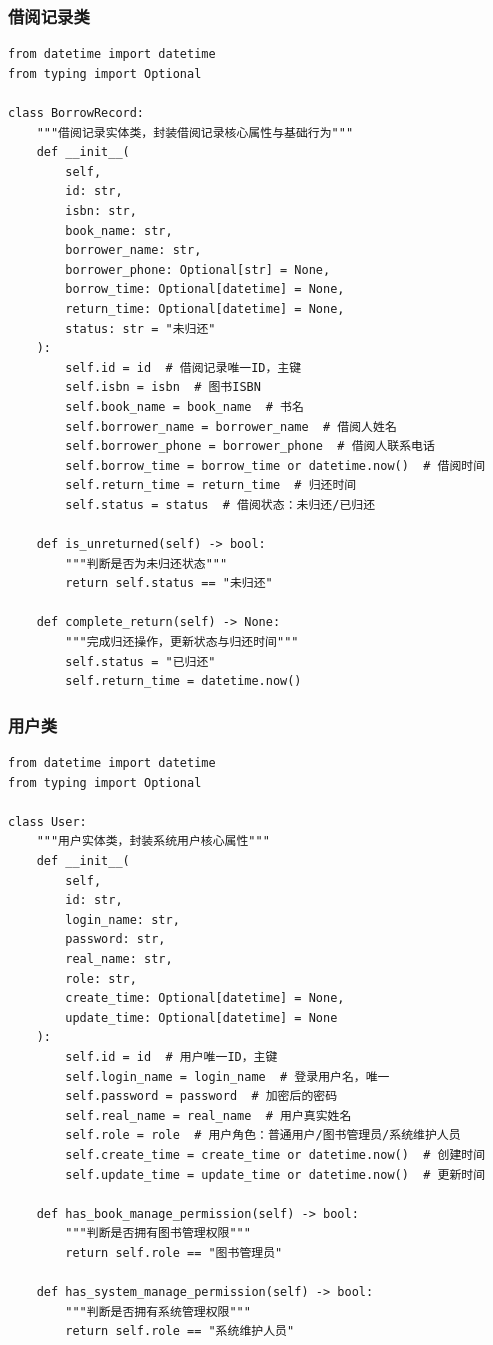 \documentclass[12pt, a4paper]{article}
\begin{document}
\subsubsection{借阅记录类}

\begin{verbatim}
from datetime import datetime
from typing import Optional

class BorrowRecord:
    """借阅记录实体类，封装借阅记录核心属性与基础行为"""
    def __init__(
        self,
        id: str,
        isbn: str,
        book_name: str,
        borrower_name: str,
        borrower_phone: Optional[str] = None,
        borrow_time: Optional[datetime] = None,
        return_time: Optional[datetime] = None,
        status: str = "未归还"
    ):
        self.id = id  # 借阅记录唯一ID，主键
        self.isbn = isbn  # 图书ISBN
        self.book_name = book_name  # 书名
        self.borrower_name = borrower_name  # 借阅人姓名
        self.borrower_phone = borrower_phone  # 借阅人联系电话
        self.borrow_time = borrow_time or datetime.now()  # 借阅时间
        self.return_time = return_time  # 归还时间
        self.status = status  # 借阅状态：未归还/已归还

    def is_unreturned(self) -> bool:
        """判断是否为未归还状态"""
        return self.status == "未归还"

    def complete_return(self) -> None:
        """完成归还操作，更新状态与归还时间"""
        self.status = "已归还"
        self.return_time = datetime.now()
\end{verbatim}

\subsubsection{用户类}
\begin{verbatim}
from datetime import datetime
from typing import Optional

class User:
    """用户实体类，封装系统用户核心属性"""
    def __init__(
        self,
        id: str,
        login_name: str,
        password: str,
        real_name: str,
        role: str,
        create_time: Optional[datetime] = None,
        update_time: Optional[datetime] = None
    ):
        self.id = id  # 用户唯一ID，主键
        self.login_name = login_name  # 登录用户名，唯一
        self.password = password  # 加密后的密码
        self.real_name = real_name  # 用户真实姓名
        self.role = role  # 用户角色：普通用户/图书管理员/系统维护人员
        self.create_time = create_time or datetime.now()  # 创建时间
        self.update_time = update_time or datetime.now()  # 更新时间

    def has_book_manage_permission(self) -> bool:
        """判断是否拥有图书管理权限"""
        return self.role == "图书管理员"

    def has_system_manage_permission(self) -> bool:
        """判断是否拥有系统管理权限"""
        return self.role == "系统维护人员"
\end{verbatim}
\end{document}
